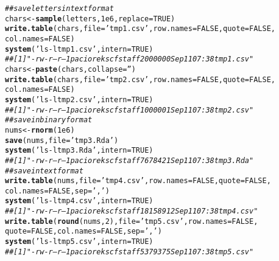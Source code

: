 \documentclass{article}\usepackage[]{graphicx}\usepackage[]{color}
\makeatletter
\newcommand{\hlnum}[1]{\textcolor[rgb]{0.686,0.059,0.569}{#1}}%
\newcommand{\hlstr}[1]{\textcolor[rgb]{0.192,0.494,0.8}{#1}}%
\newcommand{\hlcom}[1]{\textcolor[rgb]{0.678,0.584,0.686}{\textit{#1}}}%
\newcommand{\hlstd}[1]{\textcolor[rgb]{0.345,0.345,0.345}{#1}}%
\newcommand{\hlkwb}[1]{\textcolor[rgb]{0.69,0.353,0.396}{#1}}%
\newcommand{\hlkwc}[1]{\textcolor[rgb]{0.333,0.667,0.333}{#1}}%
\newcommand{\hlkwd}[1]{\textcolor[rgb]{0.737,0.353,0.396}{\textbf{#1}}}%
\newenvironment{kframe}{%
 \def\at@end@of@kframe{}%
 \ifinner\ifhmode%
  \def\at@end@of@kframe{\end{minipage}}%
  \begin{minipage}{\columnwidth}%
 \fi\fi%
 \def\FrameCommand##1{\hskip\@totalleftmargin \hskip-\fboxsep
 \colorbox{shadecolor}{##1}\hskip-\fboxsep
     \hskip-\linewidth \hskip-\@totalleftmargin \hskip\columnwidth}%
 \MakeFramed {\advance\hsize-\width
   \@totalleftmargin\z@ \linewidth\hsize
   \@setminipage}}%
 {\par\unskip\endMakeFramed%
 \at@end@of@kframe}
\newenvironment{knitrout}{}{} %
\makeatother
\begin{document}
\begin{enumerate}
\begin{enumerate}
\begin{knitrout}
\begin{kframe}
\begin{alltt}
\hlcom{## save letters in text format}
\hlstd{chars} \hlkwb{<-} \hlkwd{sample}\hlstd{(letters,} \hlnum{1e6}\hlstd{,} \hlkwc{replace} \hlstd{=} \hlnum{TRUE}\hlstd{)}
\hlkwd{write.table}\hlstd{(chars,} \hlkwc{file} \hlstd{=} \hlstr{'tmp1.csv'}\hlstd{,} \hlkwc{row.names} \hlstd{=} \hlnum{FALSE}\hlstd{,} \hlkwc{quote} \hlstd{=} \hlnum{FALSE}\hlstd{,}
\hlkwc{col.names} \hlstd{=} \hlnum{FALSE}\hlstd{)}
\hlkwd{system}\hlstd{(}\hlstr{'ls -l tmp1.csv'}\hlstd{,} \hlkwc{intern} \hlstd{=} \hlnum{TRUE}\hlstd{)}
\hlcom{## [1] "-rw-r--r-- 1 paciorek scfstaff 2000000 Sep 11 07:38 tmp1.csv"}
\hlstd{chars} \hlkwb{<-} \hlkwd{paste}\hlstd{(chars,} \hlkwc{collapse} \hlstd{=} \hlstr{''}\hlstd{)}
\hlkwd{write.table}\hlstd{(chars,} \hlkwc{file} \hlstd{=} \hlstr{'tmp2.csv'}\hlstd{,} \hlkwc{row.names} \hlstd{=} \hlnum{FALSE}\hlstd{,} \hlkwc{quote} \hlstd{=} \hlnum{FALSE}\hlstd{,}
\hlkwc{col.names} \hlstd{=} \hlnum{FALSE}\hlstd{)}
\hlkwd{system}\hlstd{(}\hlstr{'ls -l tmp2.csv'}\hlstd{,} \hlkwc{intern} \hlstd{=} \hlnum{TRUE}\hlstd{)}
\hlcom{## [1] "-rw-r--r-- 1 paciorek scfstaff 1000001 Sep 11 07:38 tmp2.csv"}
\hlcom{## save in binary format}
\hlstd{nums} \hlkwb{<-} \hlkwd{rnorm}\hlstd{(}\hlnum{1e6}\hlstd{)}
\hlkwd{save}\hlstd{(nums,} \hlkwc{file} \hlstd{=} \hlstr{'tmp3.Rda'}\hlstd{)}
\hlkwd{system}\hlstd{(}\hlstr{'ls -l tmp3.Rda'}\hlstd{,} \hlkwc{intern} \hlstd{=} \hlnum{TRUE}\hlstd{)}
\hlcom{## [1] "-rw-r--r-- 1 paciorek scfstaff 7678421 Sep 11 07:38 tmp3.Rda"}
\hlcom{## save in text format}
\hlkwd{write.table}\hlstd{(nums,} \hlkwc{file} \hlstd{=} \hlstr{'tmp4.csv'}\hlstd{,} \hlkwc{row.names} \hlstd{=} \hlnum{FALSE}\hlstd{,} \hlkwc{quote} \hlstd{=} \hlnum{FALSE}\hlstd{,}
\hlkwc{col.names} \hlstd{=} \hlnum{FALSE}\hlstd{,} \hlkwc{sep} \hlstd{=} \hlstr{','}\hlstd{)}
\hlkwd{system}\hlstd{(}\hlstr{'ls -l tmp4.csv'}\hlstd{,} \hlkwc{intern} \hlstd{=} \hlnum{TRUE}\hlstd{)}
\hlcom{## [1] "-rw-r--r-- 1 paciorek scfstaff 18158912 Sep 11 07:38 tmp4.csv"}
\hlkwd{write.table}\hlstd{(}\hlkwd{round}\hlstd{(nums,} \hlnum{2}\hlstd{),} \hlkwc{file} \hlstd{=} \hlstr{'tmp5.csv'}\hlstd{,} \hlkwc{row.names} \hlstd{=} \hlnum{FALSE}\hlstd{,}
\hlkwc{quote} \hlstd{=} \hlnum{FALSE}\hlstd{,} \hlkwc{col.names} \hlstd{=} \hlnum{FALSE}\hlstd{,} \hlkwc{sep} \hlstd{=} \hlstr{','}\hlstd{)}
\hlkwd{system}\hlstd{(}\hlstr{'ls -l tmp5.csv'}\hlstd{,} \hlkwc{intern} \hlstd{=} \hlnum{TRUE}\hlstd{)}
\hlcom{## [1] "-rw-r--r-- 1 paciorek scfstaff 5379375 Sep 11 07:38 tmp5.csv"}
\end{alltt}
\end{kframe}
\end{knitrout}




\end{enumerate}
\end{enumerate}
\end{document}
